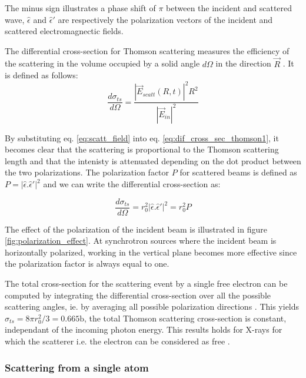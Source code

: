 The minus sign illustrates a phase shift of $\pi$ between the incident and scattered wave, $\hat{\epsilon}$ and $\hat{\epsilon}'$ are respectively the polarization vectors of the incident and scattered electromagnectic fields.

The differential cross-section for Thomson scattering measures the efficiency of the scattering in the volume occupied by a solid angle $d\Omega$ in the direction $\vec{R}$ \parencite{NielsenMcMorrow}. It is defined as follows:
\begin{equation}
    \label{eq:dif_cross_sec_thomson1}
    \frac{d\sigma_{ts}} {d \Omega} = \frac{ |\vec{E}_{scatt}(R, t)|^2 R^2} {|\vec{E}_{in}|^2}
\end{equation}

By substituting eq. \ref{eq:scatt_field} into eq. \ref{eq:dif_cross_sec_thomson1}, it becomes clear that the scattering is proportional to the Thomson scattering length and that the intenisty is attenuated depending on the dot product between the two polarizations.
The polarization factor $P$ for scattered beams is defined as $P =  | \hat{\epsilon}.\hat{\epsilon}'|^2$ and we can write the differential cross-section as:

\begin{equation}
    \frac{d\sigma_{ts}} {d \Omega} = r_0^2 | \hat{\epsilon}.\hat{\epsilon}'|^2 = r_0^2 P
\end{equation}

The effect of the polarization of the incident beam is illustrated in figure \ref{fig:polarization_effect}.
At synchrotron sources where the incident beam is horizontally polarized, working in the vertical plane becomes more effective since the polarization factor is always equal to one.

The total cross-section for the scattering event by a single free electron can be computed by integrating the differential cross-section over all the possible scattering angles, ie. by averaging all possible polarization directions \parencite{Willmott}.
This yields $\sigma_{ts} = 8 \pi r_0^2 /3 = 0.665 \si{\barn}$, the total Thomson scattering cross-section is constant, independant of the incoming photon energy. This results holds for X-rays for which the scatterer i.e. the electron can be considered as free \parencite{Willmott}.

\subsubsection{Scattering from a single atom}

